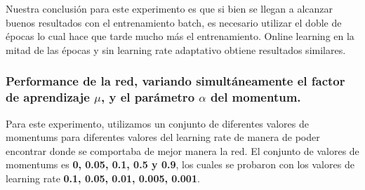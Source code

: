 Nuestra conclusión para este experimento es que si bien se llegan a alcanzar buenos resultados con el entrenamiento batch, es necesario utilizar el doble de épocas
lo cual hace que tarde mucho más el entrenamiento. Online learning en la mitad de las épocas y sin learning rate adaptativo obtiene resultados similares.

\subsubsection{Performance de la red, variando simultáneamente el factor de aprendizaje $\mu$, y el parámetro $\alpha$ del momentum.}

Para este experimento, utilizamos un conjunto de diferentes valores de momentums para diferentes valores del learning rate de manera de poder encontrar
donde se comportaba de mejor manera la red. El conjunto de valores de momentums es \textbf{0, 0.05, 0.1, 0.5 y 0.9}, los cuales se probaron con los valores
de learning rate \textbf{0.1, 0.05, 0.01, 0.005, 0.001}.

